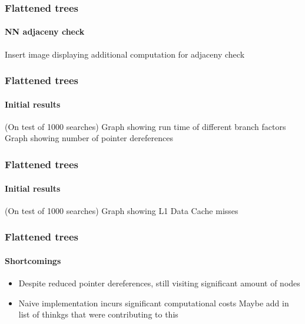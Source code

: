 \begin{frame}
  \frametitle{Flattened \kd trees}
  \framesubtitle{NN adjaceny check}

  Insert image displaying additional computation for adjaceny check

\end{frame}

\begin{frame}
  \frametitle{Flattened \kd trees}
  \framesubtitle{Initial results}

  \color{white}
  (On test of 1000 searches)
  Graph showing run time of different branch factors
  Graph showing number of pointer dereferences

\end{frame}

\begin{frame}
  \frametitle{Flattened \kd trees}
  \framesubtitle{Initial results}

  \color{white}
  (On test of 1000 searches)
  Graph showing L1 Data Cache misses

\end{frame}

\begin{frame}
  \frametitle{Flattened \kd trees}
  \framesubtitle{Shortcomings}

  \begin{itemize}
    \item Despite reduced pointer dereferences, still visiting significant amount of nodes
    \item Naive implementation incurs significant computational costs 
       Maybe add in list of thinkgs that were contributing to this
  \end{itemize}

\end{frame}
